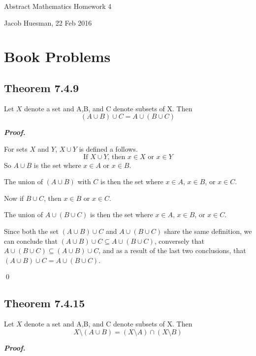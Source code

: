 \documentclass{article}
\begin{document}
\centerline{\sc \large Abstract Mathematics Homework 4}
\vspace{.5pc}
\centerline{\sc Jacob Huesman, 22 Feb 2016}

\vspace{2pc}


\section{Book Problems}
\subsection{Theorem 7.4.9}
Let $X$ denote a set and A,B, and C denote subsets of X. Then
\begin{equation}
	(A \cup B) \cup C = A \cup (B \cup C)
\end{equation}
	
\textbf{\textit{Proof.}}

For sets $X$ and $Y$, $X \cup Y$ is defined a follows.
\begin{equation}
	\text{If } X \cup Y \text{, then } x \in X \text{ or } x \in Y
\end{equation}
So $A \cup B$ is the set where $x \in A$ or $x \in B$.

The union of $(A \cup B)$ with $C$ is then the set where $x \in A$, $x \in B$, or $x \in C$.

Now if $B \cup C$, then $x \in B$ or $x \in C$.

The union of $A \cup (B \cup C)$ is then the set where $x \in A$, $x \in B$, or $x \in C$.

Since both the set $(A \cup B) \cup C$ and $A \cup (B \cup C)$ share the same definition, we
can conclude that $(A \cup B) \cup C \subseteq A \cup (B \cup C)$, conversely that 
$A \cup (B \cup C) \subseteq (A \cup B) \cup C$, and as a result of the last two conclusions,
that $(A \cup B) \cup C = A \cup (B \cup C)$.

\qed


\pagebreak
\subsection{Theorem 7.4.15}
Let $X$ denote a set and A,B, and C denote subsets of X. Then
\begin{equation}
	X \setminus (A \cup B) = (X \setminus A) \cap (X \setminus B)
\end{equation}

\textbf{\textit{Proof.}}
	
\end{document}
